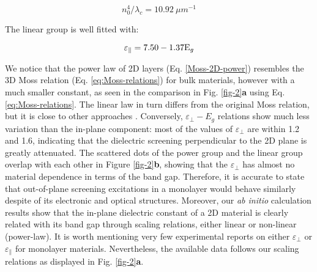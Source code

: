 \documentclass[journal=ancac3,manuscript=article,email=true,hyperref=true,keywords=true]{achemso}
\begin{document}
\begin{equation}
\label{Moss-2D-power-lambda}
n_{0}^{4}/\lambda_{c} = 10.92~ \mu m^{-1}
\end{equation}

The linear group is well fitted with: 

\begin{equation}
\label{Moss-2D-linear}
\varepsilon_{\parallel}=7.50-1.37{\rm E}_{g} 
\end{equation}

We notice that the power law of 2D layers (Eq. \ref{Moss-2D-power}) 
resembles the 3D Moss relation (Eq. \ref{eq:Moss-relations})
for bulk materials, however with a much smaller constant, 
as seen in the comparison in Fig. \ref{fig-2}{\bf a} using Eq. \ref{eq:Moss-relations}. 
The linear law in turn 
differs from the original Moss relation, but it is close to other approaches \cite{Ravindra_1979_eps_Eg,Ravindra_1980_model,Ravindra_2007_Eg_rev}.
Conversely, $\varepsilon_{\perp}-E_{g}$ relations show much less
variation than the in-plane component: most of the values of 
$\varepsilon_{\perp}$ are within 1.2 and 1.6, indicating
that the dielectric screening perpendicular to the 2D plane is greatly
attenuated. The scattered dots of the power group and the linear group
overlap with each other in Figure \ref{fig-2}{\bf b}, showing that
the $\varepsilon_{\perp}$ has almost no material dependence in terms of the band gap. 
Therefore, it is accurate to state that out-of-plane screening excitations in a monolayer 
would behave similarly despite of its electronic and optical structures.   
Moreover, our \emph{ab initio} calculation results show that the in-plane dielectric
constant of a 2D material is clearly related with its band gap through scaling relations, 
either linear or non-linear (power-law). %
It is worth mentioning very few experimental reports on either $\varepsilon_{\perp}$ or 
$\varepsilon_{\parallel}$ for 
monolayer materials\cite{BN-epsilon,Mos2-epsilon,In2Se3-epsilon}. 
Nevertheless, the available data 
follows our scaling relations as displayed in Fig. \ref{fig-2}{\bf a}. 
\end{document}
